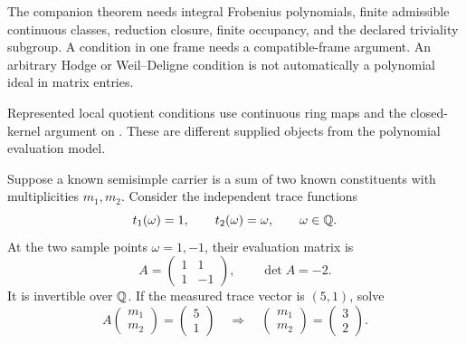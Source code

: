 
The companion theorem needs integral Frobenius polynomials, finite admissible continuous classes, reduction closure, finite occupancy, and the declared triviality subgroup. A condition in one frame needs a compatible-frame argument. An arbitrary Hodge or Weil--Deligne condition is not automatically a polynomial ideal in matrix entries.

Represented local quotient conditions use continuous ring maps and the closed-kernel argument on . These are different supplied objects from the polynomial evaluation model.


Suppose a known semisimple carrier is a sum of two known constituents with multiplicities $m_1,m_2$. Consider the independent trace functions
\[
t_1(\omega)=1,\qquad t_2(\omega)=\omega,\qquad \omega\in\mathbb Q.
\]
At the two sample points $\omega=1,-1$, their evaluation matrix is
\[
A=\begin{pmatrix}1&1\\1&-1\end{pmatrix},\qquad\det A=-2.
\]
It is invertible over $\mathbb Q$. If the measured trace vector is $(5,1)$, solve
\[
A\begin{pmatrix}m_1\\m_2\end{pmatrix}=\begin{pmatrix}5\\1\end{pmatrix}
\quad\Longrightarrow\quad
\begin{pmatrix}m_1\\m_2\end{pmatrix}=\begin{pmatrix}3\\2\end{pmatrix}.
\]

